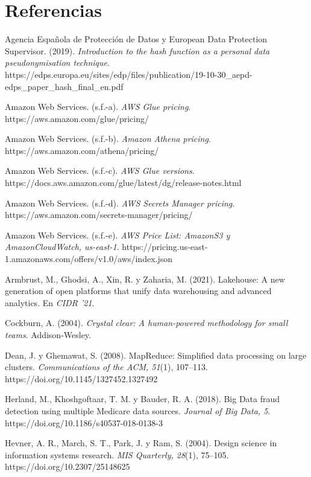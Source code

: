 \documentclass[10pt,twocolumn,letterpaper]{article}
\begin{document}
\smallskip
{}

\section*{Referencias}
{\scriptsize\raggedright\setlength{\parindent}{0pt}\setlength{\parskip}{0.5pt}

Agencia Española de Protección de Datos y European Data Protection Supervisor. (2019). \emph{Introduction to the hash function as a personal data pseudonymisation technique}. https://edps.europa.eu/sites/edp/files/publication/19-10-30\_aepd-edps\_paper\_hash\_final\_en.pdf

Amazon Web Services. (s.f.-a). \emph{AWS Glue pricing}. https://aws.amazon.com/glue/pricing/

Amazon Web Services. (s.f.-b). \emph{Amazon Athena pricing}. https://aws.amazon.com/athena/pricing/

Amazon Web Services. (s.f.-c). \emph{AWS Glue versions}. https://docs.aws.amazon.com/glue/latest/dg/release-notes.html

Amazon Web Services. (s.f.-d). \emph{AWS Secrets Manager pricing}. https://aws.amazon.com/secrets-manager/pricing/

Amazon Web Services. (s.f.-e). \emph{AWS Price List: AmazonS3 y AmazonCloudWatch, us-east-1}. https://pricing.us-east-1.amazonaws.com/offers/v1.0/aws/index.json

Armbrust, M., Ghodsi, A., Xin, R. y Zaharia, M. (2021). Lakehouse: A new generation of open platforms that unify data warehousing and advanced analytics. En \emph{CIDR '21}.

Cockburn, A. (2004). \emph{Crystal clear: A human-powered methodology for small teams}. Addison-Wesley.

Dean, J. y Ghemawat, S. (2008). MapReduce: Simplified data processing on large clusters. \emph{Communications of the ACM, 51}(1), 107--113. https://doi.org/10.1145/1327452.1327492

Herland, M., Khoshgoftaar, T. M. y Bauder, R. A. (2018). Big Data fraud detection using multiple Medicare data sources. \emph{Journal of Big Data, 5}. https://doi.org/10.1186/s40537-018-0138-3

Hevner, A. R., March, S. T., Park, J. y Ram, S. (2004). Design science in information systems research. \emph{MIS Quarterly, 28}(1), 75--105. https://doi.org/10.2307/25148625

}
\end{document}
